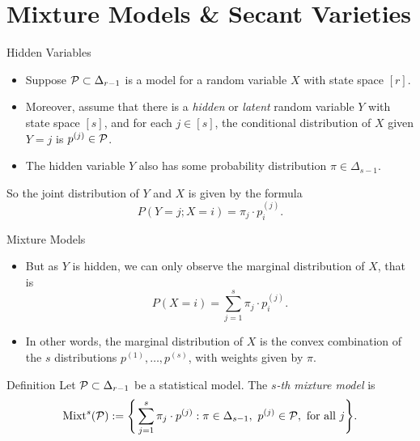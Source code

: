 \section{Mixture Models \& Secant Varieties}

\begin{frame}{Hidden Variables}
    \begin{itemize}
    \item Suppose $\mathcal{P} \subset \Delta_{r-1}$ is a model for a random variable $X$ with state space $[r]$.
    \item Moreover, assume that there is a \emph{hidden} or \emph{latent} random variable $Y$ with state space $[s]$, and for each $j \in [s]$, the conditional distribution of $X$ given $Y = j$ is $p^{(j)} \in \mathcal{P}$. 
    \item The hidden variable $Y$ also has some probability distribution $\pi \in \Delta_{s-1}$.
    \end{itemize}

    So the joint distribution of $Y$ and $X$ is given by the formula
    $$ P(Y = j; X = i) = \pi_{j} \cdot p_{i}^{(j)}. $$

\end{frame}

\begin{frame}{Mixture Models}

    \begin{itemize}
    \item But as $Y$ is hidden, we can only observe the marginal distribution of $X$, that is
    $$ P(X = i) = \sum_{j = 1}^{s} \pi_{j} \cdot p_{i}^{(j)}. $$

    \item In other words, the marginal distribution of $X$ is the convex combination of the $s$ distributions $p^{(1)}, \ldots, p^{(s)}$, with weights given by $\pi$.
    \end{itemize}

    \begin{block}{Definition}
        Let $\mathcal{P} \subset \Delta_{r-1}$ be a statistical model. The \emph{$s$-th mixture model} is
        $$ \Mixt^{s}(\mc{P}) := \Bigg\{ \sum_{j = 1}^{s} \pi_{j}\cdot p^{(j)} : \pi \in \Delta_{s-1},\ p^{(j)} \in \mc{P}, \text{ for all } j \Bigg\}. $$
    \end{block}

\end{frame}

